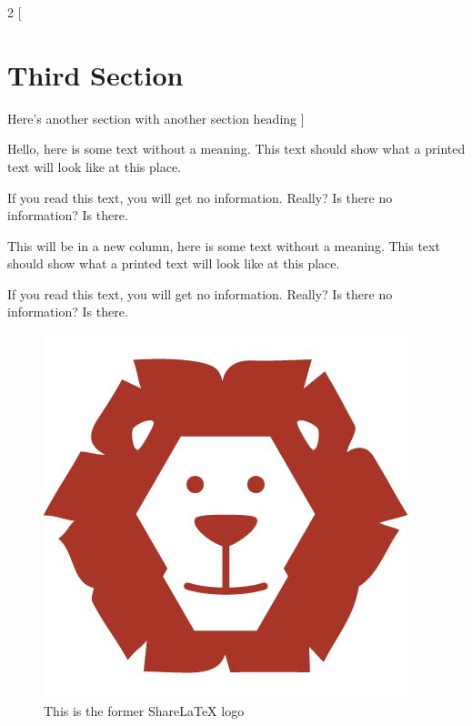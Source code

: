 \documentclass{article}
\begin{document}
\begin{multicols}{2}
[
\section{Third Section}
Here's another section with another section heading
]

Hello, here is some text without a meaning.  This text should show what 
a printed text will look like at this place.

If you read this text, you will get no information.  Really?  Is there 
no information?  Is there.

This will be in a new column, here is some text without a meaning.  This text should show what 
a printed text will look like at this place.

If you read this text, you will get no information.  Really?  Is there 
no information?  Is there.

\vfill

\begin{figure}
\includegraphics[width=\linewidth]{./lion-logo.jpg}
\caption{This is the former Share\LaTeX{} logo}
\end{figure}

\blindtext


\end{multicols}
\end{document}
